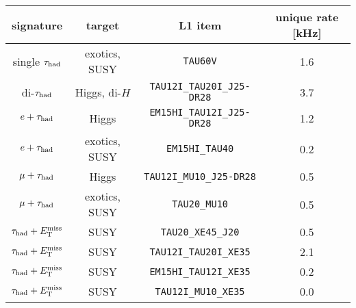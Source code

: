 \begin{tabular}{c|c|c|c}
  signature      & target        & L1 item                           & unique rate [kHz] \\
  \hline\hline
  single $\tau_\text{had}$ & exotics, SUSY & \texttt{TAU60V}                   & 1.6 \\
  di-$\tau_\text{had}$     & Higgs, di-$H$ & \texttt{TAU12I\_TAU20I\_J25-DR28} & 3.7 \\
  \hline
  $e   + \tau_\text{had}$  & Higgs         & \texttt{EM15HI\_TAU12I\_J25-DR28} & 1.2 \\
  $e   + \tau_\text{had}$  & exotics, SUSY & \texttt{EM15HI\_TAU40}            & 0.2 \\
  $\mu + \tau_\text{had}$  & Higgs         & \texttt{TAU12I\_MU10\_J25-DR28}   & 0.5 \\
  $\mu + \tau_\text{had}$  & exotics, SUSY & \texttt{TAU20\_MU10}              & 0.5 \\
  \hline
  $\tau_\text{had} + E_{\mathrm{T}}^{\mathrm{miss}}$ & SUSY          & \texttt{TAU20\_XE45\_J20}         & 0.5 \\
  $\tau_\text{had} + E_{\mathrm{T}}^{\mathrm{miss}}$ & SUSY          & \texttt{TAU12I\_TAU20I\_XE35}     & 2.1 \\
  $\tau_\text{had} + E_{\mathrm{T}}^{\mathrm{miss}}$ & SUSY          & \texttt{EM15HI\_TAU12I\_XE35}     & 0.2 \\
  $\tau_\text{had} + E_{\mathrm{T}}^{\mathrm{miss}}$ & SUSY          & \texttt{TAU12I\_MU10\_XE35}       & 0.0 \\
\end{tabular}

